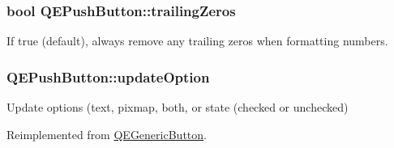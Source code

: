 \hypertarget{classQEPushButton_ab1709fe632baa21e9bf92dccee1ad920}{
\subsubsection[{trailingZeros}]{\setlength{\rightskip}{0pt plus 5cm}bool QEPushButton::trailingZeros}}
\label{classQEPushButton_ab1709fe632baa21e9bf92dccee1ad920}
If true (default), always remove any trailing zeros when formatting numbers. \hypertarget{classQEPushButton_a30f602810c258f809be5152eaeab7f70}{
\subsubsection[{updateOption}]{ QEPushButton::updateOption}}
\label{classQEPushButton_a30f602810c258f809be5152eaeab7f70}
Update options (text, pixmap, both, or state (checked or unchecked) 

Reimplemented from \hyperlink{classQEGenericButton}{QEGenericButton}.

